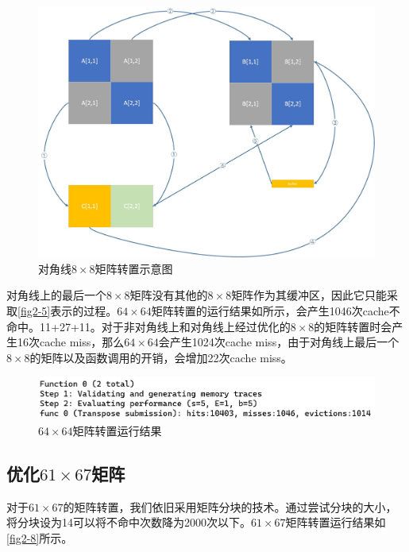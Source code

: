 \documentclass[supercite]{Experimental_Report}
\theoremstyle{definition}
\begin{document}
\begin{figure}[htb]
	\begin{center}
		\includegraphics[scale=0.4]{./images/lab2_6.jpg}
		\caption{对角线$8\times8$矩阵转置示意图}
		\label{fig2-6}
	\end{center}
\end{figure}

对角线上的最后一个$8\times8$矩阵没有其他的$8\times8$矩阵作为其缓冲区，因此它只能采取\ref{fig2-5}表示的过程。$64\times64$矩阵转置的运行结果如所示，会产生1046次cache不命中。11+27+11。对于非对角线上和对角线上经过优化的$8\times8$的矩阵转置时会产生16次cache miss，那么$64\times64$会产生1024次cache miss，由于对角线上最后一个$8\times8$的矩阵以及函数调用的开销，会增加22次cache miss。

\begin{figure}[htb]
	\begin{center}
		\includegraphics[scale=0.5]{./images/lab2_7.jpg}
		\caption{$64\times64$矩阵转置运行结果}
		\label{fig2-7}
	\end{center}
\end{figure}



\subsection{优化$61\times67$矩阵}
对于$61\times67$的矩阵转置，我们依旧采用矩阵分块的技术。通过尝试分块的大小，将分块设为14可以将不命中次数降为2000次以下。$61\times67$矩阵转置运行结果如\ref{fig2-8}所示。
\end{document}

